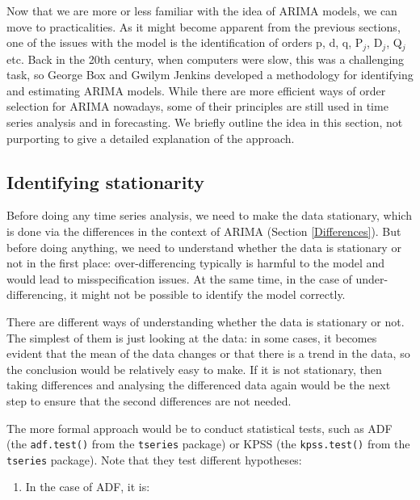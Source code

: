 \documentclass[
]{book}
\providecommand{\tightlist}{%
  \setlength{\itemsep}{0pt}\setlength{\parskip}{0pt}}
\theoremstyle{definition}
\theoremstyle{definition}
\theoremstyle{definition}
\theoremstyle{definition}
\theoremstyle{remark}
\begin{document}
Now that we are more or less familiar with the idea of ARIMA models, we can move to practicalities. As it might become apparent from the previous sections, one of the issues with the model is the identification of orders p, d, q, P\(_j\), D\(_j\), Q\(_j\) etc. Back in the 20th century, when computers were slow, this was a challenging task, so George Box and Gwilym Jenkins \citep{Box1976} developed a methodology for identifying and estimating ARIMA models. While there are more efficient ways of order selection for ARIMA nowadays, some of their principles are still used in time series analysis and in forecasting. We briefly outline the idea in this section, not purporting to give a detailed explanation of the approach.

\hypertarget{identifying-stationarity}{%
\subsection{Identifying stationarity}\label{identifying-stationarity}}

Before doing any time series analysis, we need to make the data stationary, which is done via the differences in the context of ARIMA (Section \ref{Differences}). But before doing anything, we need to understand whether the data is stationary or not in the first place: over-differencing typically is harmful to the model and would lead to misspecification issues. At the same time, in the case of under-differencing, it might not be possible to identify the model correctly.

There are different ways of understanding whether the data is stationary or not. The simplest of them is just looking at the data: in some cases, it becomes evident that the mean of the data changes or that there is a trend in the data, so the conclusion would be relatively easy to make. If it is not stationary, then taking differences and analysing the differenced data again would be the next step to ensure that the second differences are not needed.

The more formal approach would be to conduct statistical tests, such as ADF (the \texttt{adf.test()} from the \texttt{tseries} package) or KPSS (the \texttt{kpss.test()} from the \texttt{tseries} package). Note that they test different hypotheses:

\begin{enumerate}
\def\labelenumi{\arabic{enumi}.}
\tightlist
\item
  In the case of ADF, it is:
\end{enumerate}
\end{document}
